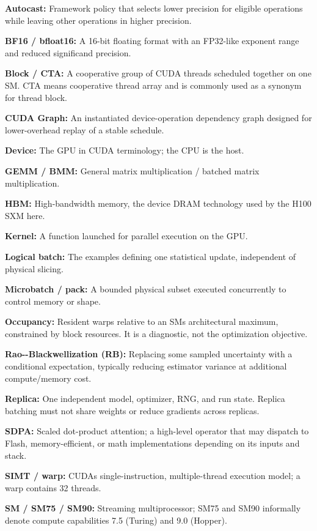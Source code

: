 \documentclass[
  10pt,
  letterpaper,
]{article}
\begin{document}
\textbf{Autocast:} Framework policy that selects lower precision for
eligible operations while leaving other operations in higher precision.

\textbf{BF16 / bfloat16:} A 16-bit floating format with an FP32-like
exponent range and reduced significand precision.

\textbf{Block / CTA:} A cooperative group of CUDA threads scheduled
together on one SM. CTA means cooperative thread array and is commonly
used as a synonym for thread block.

\textbf{CUDA Graph:} An instantiated device-operation dependency graph
designed for lower-overhead replay of a stable schedule.

\textbf{Device:} The GPU in CUDA terminology; the CPU is the host.

\textbf{GEMM / BMM:} General matrix multiplication / batched matrix
multiplication.

\textbf{HBM:} High-bandwidth memory, the device DRAM technology used by
the H100 SXM here.

\textbf{Kernel:} A function launched for parallel execution on the GPU.

\textbf{Logical batch:} The examples defining one statistical update,
independent of physical slicing.

\textbf{Microbatch / pack:} A bounded physical subset executed
concurrently to control memory or shape.

\textbf{Occupancy:} Resident warps relative to an SM\textquotesingle s
architectural maximum, constrained by block resources. It is a
diagnostic, not the optimization objective.

\textbf{Rao-\/-Blackwellization (RB):} Replacing some sampled
uncertainty with a conditional expectation, typically reducing estimator
variance at additional compute/memory cost.

\textbf{Replica:} One independent model, optimizer, RNG, and run state.
Replica batching must not share weights or reduce gradients across
replicas.

\textbf{SDPA:} Scaled dot-product attention; a high-level operator that
may dispatch to Flash, memory-efficient, or math implementations
depending on its inputs and stack.

\textbf{SIMT / warp:} CUDA\textquotesingle s single-instruction,
multiple-thread execution model; a warp contains 32 threads.

\textbf{SM / SM75 / SM90:} Streaming multiprocessor; SM75 and SM90
informally denote compute capabilities 7.5 (Turing) and 9.0 (Hopper).
\end{document}
